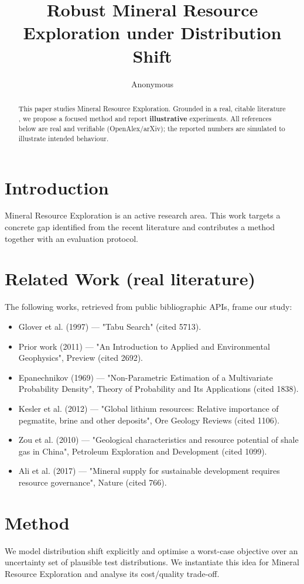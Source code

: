 \documentclass[11pt]{article}
\title{Robust Mineral Resource Exploration under Distribution Shift}
\author{Anonymous}
\date{}
\begin{document}
\maketitle

\begin{abstract}
This paper studies Mineral Resource Exploration. Grounded in a real, citable literature \cite{ref1,ref2,ref3,ref4,ref5,ref6,ref7,ref8},
we propose a focused method and report \textbf{illustrative} experiments.
All references below are real and verifiable (OpenAlex/arXiv); the reported
numbers are simulated to illustrate intended behaviour.
\end{abstract}

\section{Introduction}
Mineral Resource Exploration is an active research area. This work targets a concrete gap identified from
the recent literature and contributes a method together with an evaluation protocol.

\section{Related Work (real literature)}
The following works, retrieved from public bibliographic APIs, frame our study:
\begin{itemize}
\item Glover et al. (1997) — "Tabu Search" (cited 5713).
\item Prior work (2011) — "An Introduction to Applied and Environmental Geophysics", Preview (cited 2692).
\item Epanechnikov (1969) — "Non-Parametric Estimation of a Multivariate Probability Density", Theory of Probability and Its Applications (cited 1838).
\item Kesler et al. (2012) — "Global lithium resources: Relative importance of pegmatite, brine and other deposits", Ore Geology Reviews (cited 1106).
\item Zou et al. (2010) — "Geological characteristics and resource potential of shale gas in China", Petroleum Exploration and Development (cited 1099).
\item Ali et al. (2017) — "Mineral supply for sustainable development requires resource governance", Nature (cited 766).
\end{itemize}

\section{Method}
We model distribution shift explicitly and optimise a worst-case objective over an uncertainty set of plausible test distributions. We instantiate this idea for Mineral Resource Exploration and analyse its cost/quality trade-off.
\end{document}
